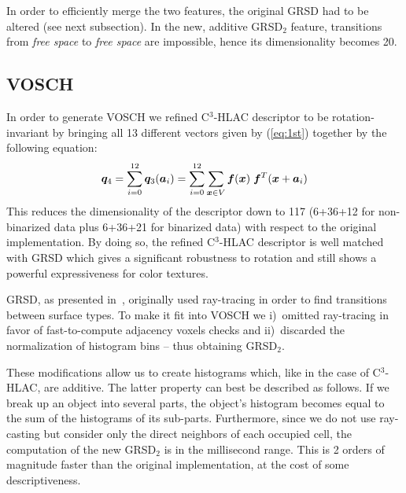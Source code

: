 \documentclass[a4paper, 10 pt, conference]{sty/ieeeconf}
\begin{document}
In order to efficiently merge the two features, the original GRSD had to be altered (see next subsection). 
In the new, additive GRSD$_2$ feature, transitions from \emph{free space} to \emph{free space} are impossible,
hence its dimensionality becomes 20.

\subsection{VOSCH}
\label{sec:VOSCH}
In order to generate VOSCH we refined C$^3$-HLAC descriptor to be rotation-invariant by bringing all  
13 different vectors given by (\ref{eq:1st}) together by the following equation: 
\begin{equation}\label{eq:1st_new}
  {\bm q_4} = \sum_{i=0}^{12} {\bm q_3}({\bm a}_i) = \sum_{i=0}^{12}\sum_{{\bm x} \in V} \bm{f}({\bm x}) \hspace{1mm}\bm{f}^T({\bm x}+{\bm a_i}) \\
\end{equation}
%
This reduces the dimensionality of the descriptor down to 117 (6+36+12 for non-binarized data plus 6+36+21 
for binarized data) with respect to the original implementation. 
By doing so, the refined C$^3$-HLAC descriptor is well matched with GRSD which gives a significant 
robustness to rotation and still shows a powerful expressiveness for color textures.

GRSD, as presented in~\cite{GRSD10Humanoids}, originally used
ray-tracing in order to find transitions between surface types. To make it fit into VOSCH 
we i)~omitted ray-tracing in favor of fast-to-compute adjacency voxels checks and ii)~discarded
the normalization of histogram bins -- thus obtaining GRSD$_2$.

These modifications allow us to create histograms which, like in the case of C$^3$-HLAC, are additive.
The latter property can best be described as follows. 
If we break up an object into several parts, 
the object's histogram becomes equal to the sum of the histograms of its sub-parts. 
%
%
 Furthermore, since we do not use ray-casting but 
consider only the direct neighbors of each occupied cell, the computation of the new GRSD$_2$ is in 
the millisecond range. This is 2 orders of magnitude faster than the original implementation,
at the cost of some descriptiveness.
\end{document}
